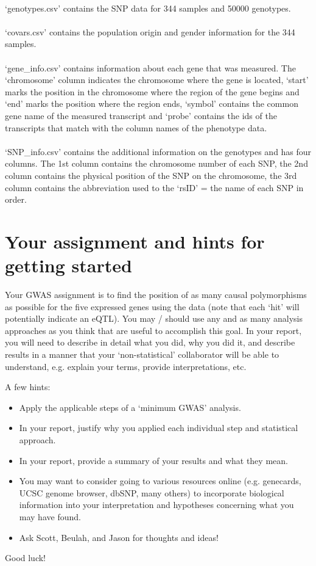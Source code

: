 \documentclass[letterpaper, 11pt]{article}
\begin{document}
\\
`genotypes.csv' contains the SNP data for 344 samples and 50000 genotypes.\\
\\
`covars.csv' contains the population origin and gender information for the 344 samples.\\
\\
`gene\_info.csv' contains information about each gene that was measured. The `chromosome' column indicates the chromosome where the gene is located, `start' marks the position in the chromosome where the region of the gene begins and `end' marks the position where the region ends, `symbol' contains the common gene name of the measured transcript and `probe' contains the ids of the transcripts that match with the column names of the phenotype data.\\
\\
`SNP\_info.csv' contains the additional information on the genotypes and has four columns. The 1st column contains the chromosome number of each SNP, the 2nd column contains the physical position of the SNP on the chromosome, the 3rd column contains the abbreviation used to the `rsID' = the name of each SNP in order.

\section{Your assignment and hints for getting started}

Your GWAS assignment is to find the position of as many causal polymorphisms as possible for the five expressed genes using the data (note that each `hit' will potentially indicate an eQTL). You may / should use any and as many analysis approaches as you think that are useful to accomplish this goal. In your report, you will need to describe in detail what you did, why you did it, and describe results in a manner that your `non-statistical' collaborator will be able to understand, e.g. explain your terms, provide interpretations, etc.

A few hints:
\begin{itemize}
	\item Apply the applicable steps of a `minimum GWAS' analysis.
	\item In your report, justify why you applied each individual step and statistical approach.
	\item In your report, provide a summary of your results and what they mean.
	\item You may want to consider going to various resources online (e.g. genecards, UCSC genome browser, dbSNP, many others) to incorporate biological information into your interpretation and hypotheses concerning what you may have found.
	\item Ask Scott, Beulah, and Jason for thoughts and ideas!
\end{itemize}

Good luck!
\end{document}
